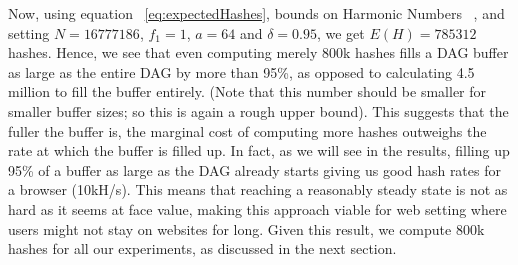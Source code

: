 \documentclass[runningheads]{llncs}
\newcommand{\trishita}[1]{{\color{magenta}\bfseries[Trishita: #1]}}
\begin{document}
Now, using equation ~\ref{eq:expectedHashes}, bounds on Harmonic Numbers ~\cite{harmonicNumber}, and setting $N = 16777186$, $f_1 = 1$, $a = 64$ and $\delta = 0.95$, we get $E(H) = 785312$ hashes.
Hence, we see that even computing merely 800k hashes fills a DAG buffer as large as the entire DAG by more than 95\%, as opposed to calculating 4.5 million to fill the buffer entirely. (Note that this number should be smaller for smaller buffer sizes; so this is again a rough upper bound). This suggests that the fuller the buffer is, the marginal cost of computing more hashes outweighs the rate at which the buffer is filled up. In fact, as we will see in the results, filling up 95\% of a buffer as large as the DAG already starts giving us good hash rates for a browser (10kH/s). 
This means that reaching a reasonably steady state is not as hard as it seems at face value, making this approach viable for web setting where users might not stay on websites for long. Given this result, we compute 800k hashes for all our experiments, as discussed in the next section.




\end{document}

